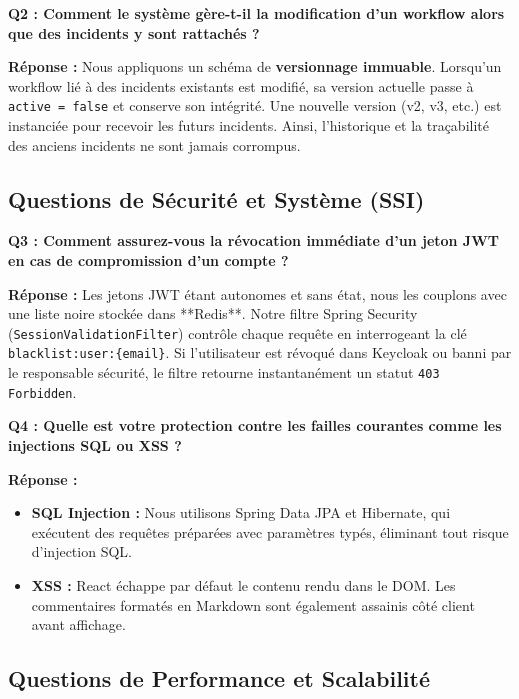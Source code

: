 \documentclass[12pt,a4paper]{article}
\begin{document}
\begin{mdframed}[backgroundcolor=lightbg, linecolor=primary, linewidth=1pt]
\textbf{Q2 : Comment le système gère-t-il la modification d'un workflow alors que des incidents y sont rattachés ?}
\end{mdframed}
\textbf{Réponse :} Nous appliquons un schéma de \textbf{versionnage immuable}. Lorsqu'un workflow lié à des incidents existants est modifié, sa version actuelle passe à \texttt{active = false} et conserve son intégrité. Une nouvelle version (v2, v3, etc.) est instanciée pour recevoir les futurs incidents. Ainsi, l'historique et la traçabilité des anciens incidents ne sont jamais corrompus.

\subsection{Questions de Sécurité et Système (SSI)}

\begin{mdframed}[backgroundcolor=lightbg, linecolor=primary, linewidth=1pt]
\textbf{Q3 : Comment assurez-vous la révocation immédiate d'un jeton JWT en cas de compromission d'un compte ?}
\end{mdframed}
\textbf{Réponse :} Les jetons JWT étant autonomes et sans état, nous les couplons avec une liste noire stockée dans **Redis**. Notre filtre Spring Security (\texttt{SessionValidationFilter}) contrôle chaque requête en interrogeant la clé \texttt{blacklist:user:\{email\}}. Si l'utilisateur est révoqué dans Keycloak ou banni par le responsable sécurité, le filtre retourne instantanément un statut \texttt{403 Forbidden}.

\begin{mdframed}[backgroundcolor=lightbg, linecolor=primary, linewidth=1pt]
\textbf{Q4 : Quelle est votre protection contre les failles courantes comme les injections SQL ou XSS ?}
\end{mdframed}
\textbf{Réponse :}
\begin{itemize}
    \item \textbf{SQL Injection :} Nous utilisons Spring Data JPA et Hibernate, qui exécutent des requêtes préparées avec paramètres typés, éliminant tout risque d'injection SQL.
    \item \textbf{XSS :} React échappe par défaut le contenu rendu dans le DOM. Les commentaires formatés en Markdown sont également assainis côté client avant affichage.
\end{itemize}

\subsection{Questions de Performance et Scalabilité}
\end{document}
